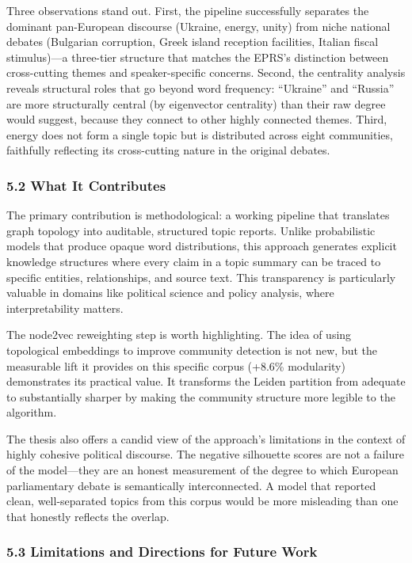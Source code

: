 \documentclass[11pt]{article}
\begin{document}
Three observations stand out. First, the pipeline successfully separates the dominant pan-European discourse (Ukraine, energy, unity) from niche national debates (Bulgarian corruption, Greek island reception facilities, Italian fiscal stimulus)---a three-tier structure that matches the EPRS's distinction between cross-cutting themes and speaker-specific concerns. Second, the centrality analysis reveals structural roles that go beyond word frequency: ``Ukraine'' and ``Russia'' are more structurally central (by eigenvector centrality) than their raw degree would suggest, because they connect to other highly connected themes. Third, energy does not form a single topic but is distributed across eight communities, faithfully reflecting its cross-cutting nature in the original debates.


\subsubsection{5.2 What It Contributes}


The primary contribution is methodological: a working pipeline that translates graph topology into auditable, structured topic reports. Unlike probabilistic models that produce opaque word distributions, this approach generates explicit knowledge structures where every claim in a topic summary can be traced to specific entities, relationships, and source text. This transparency is particularly valuable in domains like political science and policy analysis, where interpretability matters.

The node2vec reweighting step is worth highlighting. The idea of using topological embeddings to improve community detection is not new, but the measurable lift it provides on this specific corpus (+8.6\% modularity) demonstrates its practical value. It transforms the Leiden partition from adequate to substantially sharper by making the community structure more legible to the algorithm.

The thesis also offers a candid view of the approach's limitations in the context of highly cohesive political discourse. The negative silhouette scores are not a failure of the model---they are an honest measurement of the degree to which European parliamentary debate is semantically interconnected. A model that reported clean, well-separated topics from this corpus would be more misleading than one that honestly reflects the overlap.


\subsubsection{5.3 Limitations and Directions for Future Work}
\end{document}
